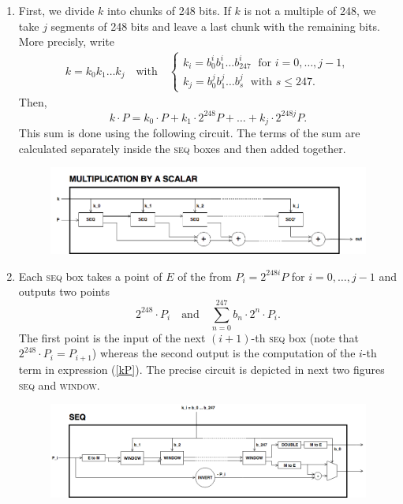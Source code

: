 \documentclass{article}
\begin{document}
\begin{spacing}{1.2}
		\begin{enumerate}
			
			\item First, we divide $k$ into chunks of 248 bits. If $k$ is not a multiple of 248, we take $j$ segments of 248 bits and leave a last chunk with the remaining bits. More precisly, write 
			\begin{gather*}
			k = k_0 k_1 \dots k_j 	\quad\text{with}\quad 
				\begin{cases}
				k_i = b^i_0 b^i_1 \dots b^i_{247} 	\;\text{ for }  i = 0, \dots, j-1, \\
				k_j = b^j_0 b^j_1 \dots b^j_s 	\;\text{ with } s\leq 247.
				\end{cases}
			\end{gather*}
			Then,  
			\begin{equation}
			\label{kP}
			k\cdot P = k_0\cdot P + k_1\cdot 2^{248}P +\dots+ k_j\cdot 2^{248j}P. 	
			\end{equation}
			This sum is done using the following circuit. 
			The terms of the sum are calculated separately inside the \textsc{seq} boxes and then added together. 
			
			\begin{figure}[h]
				\centering
				\includegraphics[scale=0.45]{../../figures/multiplication.png}
			\end{figure}
			
			\item Each \textsc{seq} box takes a point of $E$ of the from $P_i = 2^{248 i} P$ for $i=0,\dots,j-1$ and outputs two points %
			$$ 	
			2^{248} \cdot P_i 
			\quad \text{and} \quad
			\sum_{n = 0}^{247} b_n \cdot 2^{n} \cdot P_i. 
			$$
			The first point is the input of the next $(i+1)$-th \textsc{seq} box (note that $ 2^{248} \cdot P_i = P_{i+1}$) whereas the second output is the computation of the $i$-th term in expression (\ref{kP}). The precise circuit is depicted in next two figures \textsc{seq} and \textsc{window}.
			
			\begin{figure}[h]
				\centering
				\includegraphics[scale=0.43]{../../figures/multiplication-SEQ.png}\\
				\vspace{0.5cm}
				

\end{figure}
\end{enumerate}
\end{spacing}
\end{document}
